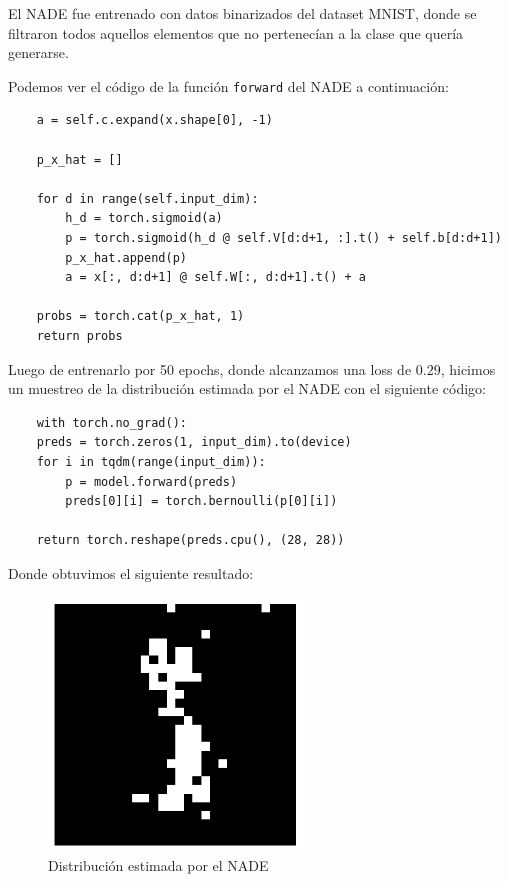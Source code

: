 \documentclass[11pt]{article}
\begin{document}
El NADE fue entrenado con datos binarizados del dataset MNIST, donde se filtraron todos aquellos elementos que no pertenecían a la clase que quería generarse.

Podemos ver el código de la función \texttt{forward} del NADE a continuación:

\begin{verbatim}
    a = self.c.expand(x.shape[0], -1)

    p_x_hat = []

    for d in range(self.input_dim):
        h_d = torch.sigmoid(a)
        p = torch.sigmoid(h_d @ self.V[d:d+1, :].t() + self.b[d:d+1])
        p_x_hat.append(p)
        a = x[:, d:d+1] @ self.W[:, d:d+1].t() + a

    probs = torch.cat(p_x_hat, 1)
    return probs
\end{verbatim}

Luego de entrenarlo por 50 epochs, donde alcanzamos una loss de $0.29$, hicimos un muestreo de la distribución estimada por el NADE con el siguiente código:
\begin{verbatim}
    with torch.no_grad():
    preds = torch.zeros(1, input_dim).to(device)
    for i in tqdm(range(input_dim)):
        p = model.forward(preds)
        preds[0][i] = torch.bernoulli(p[0][i])

    return torch.reshape(preds.cpu(), (28, 28))
\end{verbatim}
Donde obtuvimos el siguiente resultado:

\begin{figure}[h]
    \centering
    \includegraphics[width=0.6\textwidth]{NADE/nade_generation.png}
    \caption{Distribución estimada por el NADE}
    \label{fig:nade_gen}
\end{figure}
\end{document}
